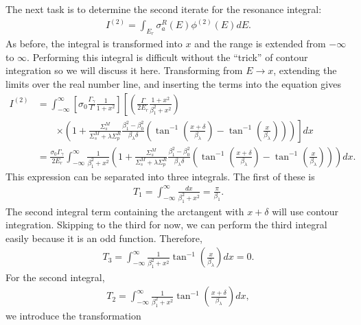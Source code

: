 The next task is to determine the second iterate for the resonance integral:
\begin{align}
  I^{(2)} = \int_{E_r} \sigma_a^R(E) \phi^{(2)}(E) dE . 
\end{align}
As before, the integral is transformed into $x$ and the range is extended from $-\infty$ to $\infty$. Performing this integral is difficult without the ``trick'' of contour integration so we will discuss it here. Transforming from $E \rightarrow x$, extending the limits over the real number line, and inserting the terms into the equation gives
\begin{align}
  I^{(2)} &= \int_{-\infty}^\infty \left[ \sigma_0 \frac{\Gamma_\gamma}{\Gamma} \frac{1}{1 + x^2} \right] 
  \left[ \left( \frac{\Gamma}{2 E_r} \frac{1 + x^2}{\beta_1^2 + x^2} \right) \right. \nonumber \\
  &\qquad \left. \times \left( 1 + \frac{\Sigma_s^M}{\Sigma_s^M + \lambda \Sigma_p^R } \frac{  \beta_1^2 - \beta_0^2 }{ \beta_\lambda \delta } 
  \left( \tan^{-1} \left( \frac{x+\delta}{\beta_\lambda} \right) - \tan^{-1} \left( \frac{x}{\beta_\lambda} \right) \right) \right) \right] dx \nonumber \\
  &= \frac{\sigma_0 \Gamma_\gamma}{2E_r} \int_{-\infty}^\infty \frac{1}{\beta_1^2 + x^2}
  \left( 1 + \frac{\Sigma_s^M}{\Sigma_s^M + \lambda \Sigma_p^R } \frac{  \beta_1^2 - \beta_0^2 }{ \beta_\lambda \delta } 
  \left( \tan^{-1} \left( \frac{x+\delta}{\beta_\lambda} \right) - \tan^{-1} \left( \frac{x}{\beta_\lambda} \right) \right) \right) dx .
\end{align}
This expression can be separated into three integrals. The first of these is
\begin{align}
  T_1 = \int_{-\infty}^\infty \frac{dx}{\beta_1^2 + x^2} = \frac{\pi}{\beta_1} .
\end{align}
The second integral term containing the arctangent with $x + \delta$ will use contour integration. Skipping to the third for now, we can perform the third integral easily because it is an odd function. Therefore,
\begin{align}
  T_3 = \int_{-\infty}^\infty \frac{1}{\beta_1^2 + x^2} \tan^{-1} \left( \frac{x}{\beta_\lambda} \right) dx = 0.
\end{align}
For the second integral, 
\begin{align}
  T_2 = \int_{-\infty}^\infty \frac{1}{\beta_1^2 + x^2} \tan^{-1} \left( \frac{x + \delta}{\beta_\lambda} \right) dx ,
\end{align}
we introduce the transformation
